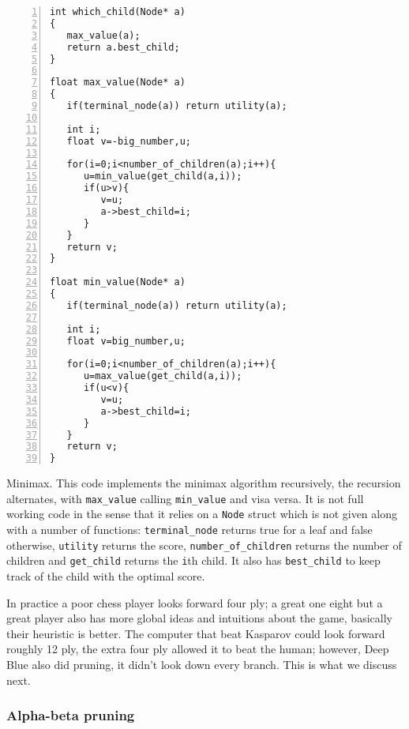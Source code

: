\documentclass[11pt,a4paper]{scrartcl}
\begin{document}
\begin{table}
\begin{lstlisting}[numbers=left]
int which_child(Node* a)
{
   max_value(a);
   return a.best_child;
}

float max_value(Node* a)
{
   if(terminal_node(a)) return utility(a);

   int i;
   float v=-big_number,u;
   
   for(i=0;i<number_of_children(a);i++){
      u=min_value(get_child(a,i));
      if(u>v){
         v=u;
         a->best_child=i;
      }
   }
   return v;
}

float min_value(Node* a)
{
   if(terminal_node(a)) return utility(a);

   int i;
   float v=big_number,u;
   
   for(i=0;i<number_of_children(a);i++){
      u=max_value(get_child(a,i));
      if(u<v){
         v=u;
         a->best_child=i;
      }
   }
   return v;
}
\end{lstlisting}
\caption{Minimax. This code implements the minimax algorithm
  recursively, the recursion alternates, with \texttt{max\_value}
  calling \texttt{min\_value} and visa versa. It is not full working
  code in the sense that it relies on a \texttt{Node} struct which is
  not given along with a number of functions: \texttt{terminal\_node}
  returns true for a leaf and false otherwise, \texttt{utility}
  returns the score, \texttt{number\_of\_children} returns the number
  of children and \texttt{get\_child} returns the \texttt{i}th
  child. It also has \texttt{best\_child} to keep track of the child
  with the optimal score.\label{c_minimax}}
\end{table}

In practice a poor chess player looks forward four ply; a great one
eight but a great player also has more global ideas and intuitions
about the game, basically their heuristic is better. The computer that
beat Kasparov could look forward roughly 12 ply, the extra four ply
allowed it to beat the human; however, Deep Blue also did pruning, it
didn't look down every branch. This is what we discuss next.

\subsubsection*{Alpha-beta pruning}
\end{document}

